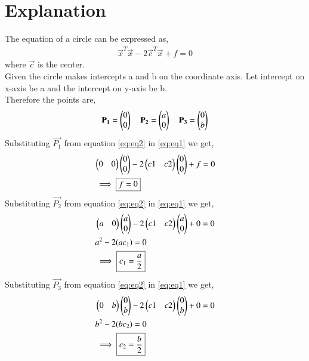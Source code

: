 \documentclass[journal,12pt,twocolumn]{IEEEtran}
\begin{document}
\section{Explanation}
The equation of a circle can be expressed as,
\begin{align}
    \vec{x}^{T}\vec{x} - 2\vec{c}^{T}\vec{x} +f=0 \label{eq:eq1}
\end{align}
where $\vec{c}$ is the center.\\
Given the circle makes intercepts a and b on the coordinate axis. Let intercept on x-axis be a and the intercept on y-axis be b.\\
Therefore the points are,
\begin{align}
    \mathbf{P_1}=\begin{pmatrix}0\\0\end{pmatrix} \quad \mathbf{P_2}=\begin{pmatrix}a\\0\end{pmatrix} \quad \mathbf{P_3}=\begin{pmatrix}0\\b\end{pmatrix} \label{eq:eq2}
\end{align}
Substituting $\vec{P_1}$ from equation \eqref{eq:eq2} in \eqref{eq:eq1} we get,
\begin{align}
    &\begin{pmatrix}0&0\end{pmatrix}\begin{pmatrix}0\\0\end{pmatrix} -2\begin{pmatrix}c1&c2\end{pmatrix}\begin{pmatrix}0\\0\end{pmatrix}+f=0\\
    &\implies \boxed{f=0} \label{eq:eq3}
\end{align}
Substituting $\vec{P_2}$ from equation \eqref{eq:eq2} in \eqref{eq:eq1} we get,
\begin{align}
    &\begin{pmatrix}a&0\end{pmatrix}\begin{pmatrix}a\\0\end{pmatrix} -2\begin{pmatrix}c1&c2\end{pmatrix}\begin{pmatrix}a\\0\end{pmatrix}+0=0\\
    &a^{2}-2(ac_1)=0\\
    &\implies \boxed{c_1=\frac{a}{2}} \label{eq:eq4}
\end{align}
Substituting $\vec{P_3}$ from equation \eqref{eq:eq2} in \eqref{eq:eq1} we get,
\begin{align}
    &\begin{pmatrix}0&b\end{pmatrix}\begin{pmatrix}0\\b\end{pmatrix} -2\begin{pmatrix}c1&c2\end{pmatrix}\begin{pmatrix}0\\b\end{pmatrix}+0=0\\
    &b^{2}-2(bc_2)=0\\
    &\implies \boxed{c_2=\frac{b}{2}} \label{eq:eq5}
\end{align}
\renewcommand{\thefigure}{\arabic{figure}}
\end{document}
